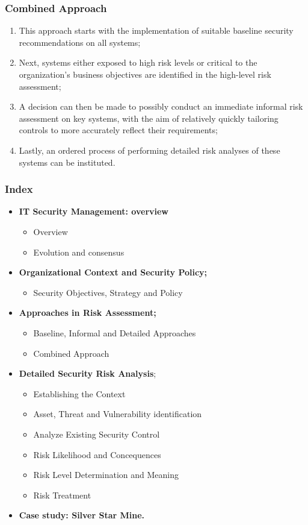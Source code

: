 \documentclass[xcolor ={table,usenames,dvipsnames}]{beamer}
\theoremstyle{definition}
\begin{document}
	\begin{frame}
		\frametitle{Combined Approach}
		\begin{enumerate}
			\item This approach starts with the implementation of suitable baseline security recommendations on all systems;
			\item Next, systems either exposed to high risk levels or critical to the organization's business objectives are identified in the high-level risk assessment;
			\item A decision can then be made to possibly conduct an immediate informal risk assessment on key systems, with the aim of relatively quickly tailoring controls to more accurately reflect their requirements;
			\item Lastly, an ordered process of performing detailed risk analyses of these systems can be instituted.
		\end{enumerate}
	\end{frame}
	
	\begin{frame}
		\frametitle{Index}
		\begin{itemize}
			\item <0> \textbf{IT Security Management: overview}
			\begin{itemize}
				\item Overview
				\item Evolution and consensus
			\end{itemize}
			\item <0>  \textbf{Organizational Context and Security Policy;}
			\begin{itemize}
				\item Security Objectives, Strategy and Policy
			\end{itemize}
			\item <0>  \textbf{Approaches in Risk Assessment;}
			\begin{itemize}
				\item Baseline, Informal and Detailed Approaches
				\item Combined Approach
			\end{itemize}
			\item <1-> \textbf{Detailed Security Risk Analysis};
			\begin{itemize}
				\item Establishing the Context
				\item Asset, Threat and Vulnerability identification
				\item Analyze Existing Security Control
				\item Risk Likelihood and Concequences
				\item Risk Level Determination and Meaning
				\item Risk Treatment
			\end{itemize}
			\item <0> \textbf{Case study: Silver Star Mine.}
		\end{itemize}
	\end{frame}
	
\end{document}
